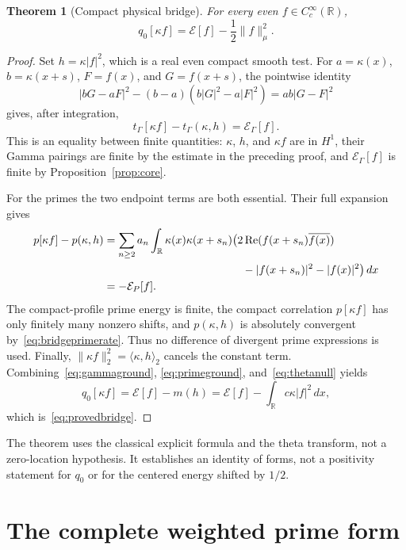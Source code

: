 \documentclass[11pt,a4paper]{article}
\numberwithin{equation}{section}
\newtheorem{theorem}{Theorem}[section]
\theoremstyle{remark}
\newcommand{\R}{\mathbb R}
\newcommand{\E}{\mathcal E}
\newcommand{\tg}{t_{\Gamma}}
\newcommand{\ip}[2]{\langle #1,#2\rangle}
\newcommand{\norm}[1]{\lVert #1\rVert}
\begin{document}
\begin{theorem}[Compact physical bridge]\label{thm:compactbridge}
For every even $f\in C_c^\infty(\R)$,
\begin{equation}\label{eq:provedbridge}
 q_0[\kappa f]=\E[f]-\frac12\norm{f}_\mu^2.
\end{equation}
\end{theorem}
\begin{proof}
Set $h=\kappa|f|^2$, which is a real even compact smooth test. For $a=\kappa(x)$, $b=\kappa(x+s)$, $F=f(x)$, and $G=f(x+s)$, the pointwise identity
\[
 |bG-aF|^2-(b-a)(b|G|^2-a|F|^2)=ab|G-F|^2
\]
gives, after integration,
\begin{equation}\label{eq:gammaground}
 \tg[\kappa f]-\tg(\kappa,h)=\E_\Gamma[f].
\end{equation}
This is an equality between finite quantities: $\kappa$, $h$, and $\kappa f$ are in $H^1$, their Gamma pairings are finite by the estimate in the preceding proof, and $\E_\Gamma[f]$ is finite by Proposition~\ref{prop:core}.

For the primes the two endpoint terms are both essential. Their full expansion gives
\begin{align}\label{eq:primeground}
 p[\kappa f]-p(\kappa,h)
 &=\sum_{n\ge2}a_n\int_\R\kappa(x)\kappa(x+s_n)
       \bigl(2\operatorname{Re}(f(x+s_n)\overline{f(x)})\notag\\
 &\hspace{44mm}-|f(x+s_n)|^2-|f(x)|^2\bigr)\,dx\notag\\
 &=-\E_P[f].
\end{align}
The compact-profile prime energy is finite, the compact correlation $p[\kappa f]$ has only finitely many nonzero shifts, and $p(\kappa,h)$ is absolutely convergent by~\eqref{eq:bridgeprimerate}. Thus no difference of divergent prime expressions is used. Finally,
$\norm{\kappa f}_2^2=\ip{\kappa}{h}_2$ cancels the constant term. Combining~\eqref{eq:gammaground}, \eqref{eq:primeground}, and~\eqref{eq:thetanull} yields
\[
 q_0[\kappa f]=\E[f]-m(h)
             =\E[f]-\int_\R c\kappa|f|^2\,dx,
\]
which is~\eqref{eq:provedbridge}.
\end{proof}

The theorem uses the classical explicit formula and the theta transform, not a zero-location hypothesis. It establishes an identity of forms, not a positivity statement for $q_0$ or for the centered energy shifted by $1/2$.

\section{The complete weighted prime form}\label{sec:prime}
\end{document}
